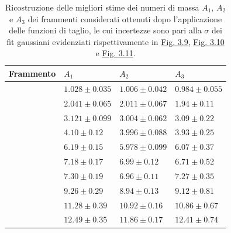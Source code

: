 \documentclass[12pt,a4paper,twoside]{report}
\begin{document}
	\begin{table}[H]
		\begin{minipage}{\textwidth}
			\centering
			\begin{tabular}{ |M{2.2cm}|M{3.0cm}|M{3.0cm}|M{3.0cm}| }
				\hline
				Frammento &$A_1$&$A_2$&$A_3$\\
				\hline\hline
				& $1.028\pm0.035$& $1.006\pm0.042$ &$0.984\pm0.055$\\
				\hline
				& $2.041\pm0.065$& $2.011\pm0.067$ &$1.94\pm0.11$\\
				\hline
				& $3.121\pm0.099$& $3.004\pm0.062$ &$3.09\pm0.22$\\
				\hline
				& $4.10\pm0.12$& $3.996\pm0.088$ &$3.93\pm0.25$\\
				\hline
				& $6.19\pm0.15$& $5.978 \pm0.099 $ &$6.07 \pm0.37 $\\
				\hline
				& $7.18 \pm0.17 $& $6.99 \pm0.12 $ &$6.71 \pm0.52 $\\
				\hline
				& $7.30 \pm0.19 $& $6.96 \pm0.11 $ &$7.27 \pm0.35 $\\
				\hline
				& $9.26 \pm0.29 $& $8.94 \pm0.13 $ &$9.12 \pm0.81 $\\
				\hline
				& $11.28\pm0.39 $& $10.92\pm0.16 $ &$10.86 \pm0.67 $\\
				\hline
				& $12.49 \pm0.35 $& $11.86 \pm0.17 $ &$12.41 \pm0.74 $\\
				\hline
			\end{tabular}
		\end{minipage}
		\caption{Ricostruzione delle migliori stime dei numeri di massa $A_1$, $A_2$ e $A_3$ dei frammenti considerati ottenuti dopo l'applicazione delle funzioni di taglio, le cui incertezze sono pari alla $\sigma$ dei fit gaussiani evidenziati rispettivamente in \hyperref[fig:a1_fragments_final]{Fig. 3.9}, \hyperref[fig:a2_fragments_final]{Fig. 3.10} e \hyperref[fig:a3_fragments_final]{Fig. 3.11}.}
		\label{tab:mass_numbers}
	\end{table}
\end{document}
